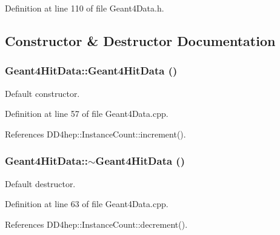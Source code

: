 Definition at line 110 of file Geant4Data.h.

\subsection{Constructor \& Destructor Documentation}
\hypertarget{class_d_d4hep_1_1_simulation_1_1_geant4_hit_data_a720c9f6193739b3ce4f23c321a4af1be}{
\subsubsection[{Geant4HitData}]{\setlength{\rightskip}{0pt plus 5cm}Geant4HitData::Geant4HitData ()}}
\label{class_d_d4hep_1_1_simulation_1_1_geant4_hit_data_a720c9f6193739b3ce4f23c321a4af1be}


Default constructor. 

Definition at line 57 of file Geant4Data.cpp.

References DD4hep::InstanceCount::increment().\hypertarget{class_d_d4hep_1_1_simulation_1_1_geant4_hit_data_a57540b8795c4a198a0925773269d99f3}{
\subsubsection[{$\sim$Geant4HitData}]{\setlength{\rightskip}{0pt plus 5cm}Geant4HitData::$\sim$Geant4HitData ()}}
\label{class_d_d4hep_1_1_simulation_1_1_geant4_hit_data_a57540b8795c4a198a0925773269d99f3}


Default destructor. 

Definition at line 63 of file Geant4Data.cpp.

References DD4hep::InstanceCount::decrement().


